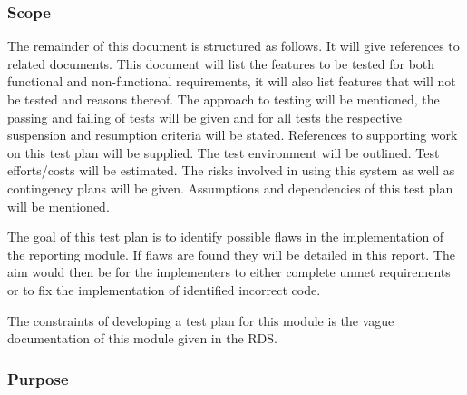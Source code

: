 \subsubsection{Scope}
The remainder of this document is structured as follows. It will give references to related documents. This document will list the features to be tested for both functional and non-functional requirements, it will also list features that will not be tested and reasons thereof. The approach to testing will be mentioned, the passing and failing of tests will be given and for all tests the respective suspension and resumption criteria will be stated. References to supporting work on this test plan will be supplied. The test environment will be outlined. Test efforts/costs will be estimated. The risks involved in using this system as well as contingency plans will be given. Assumptions and dependencies of this test plan will be mentioned.
\par The goal of this test plan is to identify possible flaws in the implementation of the reporting module. If flaws are found they will be detailed in this report. The aim would then be for the implementers to either complete unmet requirements or to fix the implementation of identified incorrect code.	
\par The constraints of developing a test plan for this module is the vague documentation of this module given in the RDS. 


\subsubsection{Purpose}

